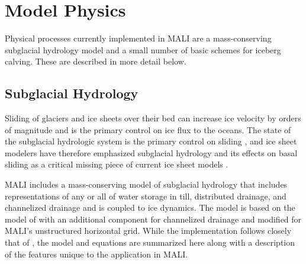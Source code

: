 \chapter{Model Physics}
\label{chap:landice-physics}



Physical processes currently implemented in MALI are a mass-conserving subglacial hydrology model and a small number of basic schemes for iceberg calving. These are described in more detail below.

\section{Subglacial Hydrology}
\label{sec:subglacialHydro}

Sliding of glaciers and ice sheets over their bed can increase ice velocity by orders of magnitude
and is the primary control on ice flux to the oceans.
The state of the subglacial hydrologic system is the primary control on sliding \citep{Clarke2005, Cuffey2010, Flowers2015},
and ice sheet modelers have therefore emphasized subglacial hydrology and its effects on basal sliding 
as a critical missing piece of current ice sheet models \citep{Little2007, Price2011a}.

MALI includes a mass-conserving model of subglacial hydrology that includes representations of any or all of
water storage in till, distributed drainage, and channelized drainage and is coupled to ice dynamics.
The model is based on the model of \citet{Bueler2015} with an additional component for channelized drainage
and modified for MALI's unstructured horizontal grid.  
While the implementation follows closely that of \citet{Bueler2015}, the model and equations are summarized here
along with a description of the features unique to the application in MALI.


